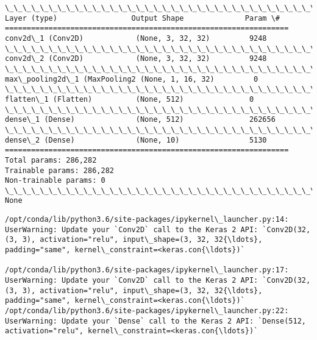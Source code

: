 \documentclass[11pt]{article}
\begin{document}
    \begin{Verbatim}[commandchars=\\\{\}]
\_\_\_\_\_\_\_\_\_\_\_\_\_\_\_\_\_\_\_\_\_\_\_\_\_\_\_\_\_\_\_\_\_\_\_\_\_\_\_\_\_\_\_\_\_\_\_\_\_\_\_\_\_\_\_\_\_\_\_\_\_\_\_\_\_
Layer (type)                 Output Shape              Param \#   
=================================================================
conv2d\_1 (Conv2D)            (None, 3, 32, 32)         9248      
\_\_\_\_\_\_\_\_\_\_\_\_\_\_\_\_\_\_\_\_\_\_\_\_\_\_\_\_\_\_\_\_\_\_\_\_\_\_\_\_\_\_\_\_\_\_\_\_\_\_\_\_\_\_\_\_\_\_\_\_\_\_\_\_\_
conv2d\_2 (Conv2D)            (None, 3, 32, 32)         9248      
\_\_\_\_\_\_\_\_\_\_\_\_\_\_\_\_\_\_\_\_\_\_\_\_\_\_\_\_\_\_\_\_\_\_\_\_\_\_\_\_\_\_\_\_\_\_\_\_\_\_\_\_\_\_\_\_\_\_\_\_\_\_\_\_\_
max\_pooling2d\_1 (MaxPooling2 (None, 1, 16, 32)         0         
\_\_\_\_\_\_\_\_\_\_\_\_\_\_\_\_\_\_\_\_\_\_\_\_\_\_\_\_\_\_\_\_\_\_\_\_\_\_\_\_\_\_\_\_\_\_\_\_\_\_\_\_\_\_\_\_\_\_\_\_\_\_\_\_\_
flatten\_1 (Flatten)          (None, 512)               0         
\_\_\_\_\_\_\_\_\_\_\_\_\_\_\_\_\_\_\_\_\_\_\_\_\_\_\_\_\_\_\_\_\_\_\_\_\_\_\_\_\_\_\_\_\_\_\_\_\_\_\_\_\_\_\_\_\_\_\_\_\_\_\_\_\_
dense\_1 (Dense)              (None, 512)               262656    
\_\_\_\_\_\_\_\_\_\_\_\_\_\_\_\_\_\_\_\_\_\_\_\_\_\_\_\_\_\_\_\_\_\_\_\_\_\_\_\_\_\_\_\_\_\_\_\_\_\_\_\_\_\_\_\_\_\_\_\_\_\_\_\_\_
dense\_2 (Dense)              (None, 10)                5130      
=================================================================
Total params: 286,282
Trainable params: 286,282
Non-trainable params: 0
\_\_\_\_\_\_\_\_\_\_\_\_\_\_\_\_\_\_\_\_\_\_\_\_\_\_\_\_\_\_\_\_\_\_\_\_\_\_\_\_\_\_\_\_\_\_\_\_\_\_\_\_\_\_\_\_\_\_\_\_\_\_\_\_\_
None

    \end{Verbatim}

    \begin{Verbatim}[commandchars=\\\{\}]
/opt/conda/lib/python3.6/site-packages/ipykernel\_launcher.py:14: UserWarning: Update your `Conv2D` call to the Keras 2 API: `Conv2D(32, (3, 3), activation="relu", input\_shape=(3, 32, 32{\ldots}, padding="same", kernel\_constraint=<keras.con{\ldots})`
  
/opt/conda/lib/python3.6/site-packages/ipykernel\_launcher.py:17: UserWarning: Update your `Conv2D` call to the Keras 2 API: `Conv2D(32, (3, 3), activation="relu", input\_shape=(3, 32, 32{\ldots}, padding="same", kernel\_constraint=<keras.con{\ldots})`
/opt/conda/lib/python3.6/site-packages/ipykernel\_launcher.py:22: UserWarning: Update your `Dense` call to the Keras 2 API: `Dense(512, activation="relu", kernel\_constraint=<keras.con{\ldots})`

    \end{Verbatim}
\end{document}
